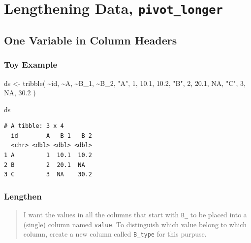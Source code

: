 \documentclass[
  letterpaper,
  DIV=11,
  numbers=noendperiod]{scrreprt}
\newenvironment{Shaded}{\begin{snugshade}}{\end{snugshade}}
\newcommand{\ConstantTok}[1]{\textcolor[rgb]{0.56,0.35,0.01}{#1}}
\newcommand{\DecValTok}[1]{\textcolor[rgb]{0.68,0.00,0.00}{#1}}
\newcommand{\FloatTok}[1]{\textcolor[rgb]{0.68,0.00,0.00}{#1}}
\newcommand{\FunctionTok}[1]{\textcolor[rgb]{0.28,0.35,0.67}{#1}}
\newcommand{\NormalTok}[1]{\textcolor[rgb]{0.00,0.23,0.31}{#1}}
\newcommand{\OtherTok}[1]{\textcolor[rgb]{0.00,0.23,0.31}{#1}}
\newcommand{\SpecialCharTok}[1]{\textcolor[rgb]{0.37,0.37,0.37}{#1}}
\newcommand{\StringTok}[1]{\textcolor[rgb]{0.13,0.47,0.30}{#1}}
\begin{document}
\section{\texorpdfstring{Lengthening Data,
\texttt{pivot\_longer}}{Lengthening Data, pivot\_longer}}\label{lengthening-data-pivot_longer}

\subsection{One Variable in Column
Headers}\label{one-variable-in-column-headers}

\subsubsection{Toy Example}\label{toy-example}

\begin{Shaded}
\begin{Highlighting}[]
\NormalTok{ds }\OtherTok{\textless{}{-}} \FunctionTok{tribble}\NormalTok{(}
  \SpecialCharTok{\textasciitilde{}}\NormalTok{id, }\SpecialCharTok{\textasciitilde{}}\NormalTok{A, }\SpecialCharTok{\textasciitilde{}}\NormalTok{B\_1, }\SpecialCharTok{\textasciitilde{}}\NormalTok{B\_2,}
  \StringTok{"A"}\NormalTok{, }\DecValTok{1}\NormalTok{, }\FloatTok{10.1}\NormalTok{, }\FloatTok{10.2}\NormalTok{,}
  \StringTok{"B"}\NormalTok{, }\DecValTok{2}\NormalTok{, }\FloatTok{20.1}\NormalTok{, }\ConstantTok{NA}\NormalTok{,}
  \StringTok{"C"}\NormalTok{, }\DecValTok{3}\NormalTok{, }\ConstantTok{NA}\NormalTok{, }\FloatTok{30.2}
\NormalTok{)}

\NormalTok{ds}
\end{Highlighting}
\end{Shaded}

\begin{verbatim}
# A tibble: 3 x 4
  id        A   B_1   B_2
  <chr> <dbl> <dbl> <dbl>
1 A         1  10.1  10.2
2 B         2  20.1  NA  
3 C         3  NA    30.2
\end{verbatim}

\subsubsection{Lengthen}\label{lengthen}

\begin{quote}
I want the values in all the columns that start with \texttt{B\_} to be
placed into a (single) column named \texttt{value}. To distinguish which
value belong to which column, create a new column called
\texttt{B\_type} for this purpuse.
\end{quote}
\end{document}
